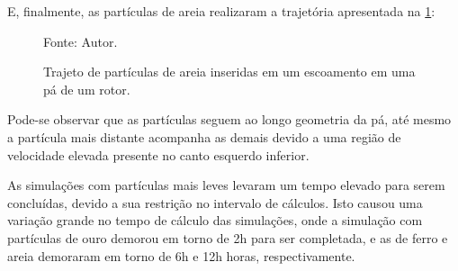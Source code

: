 E, finalmente, as partículas de areia realizaram a trajetória apresentada na \ref{rotor_trajectory_sand}:
\begin{figure}[H]
    \centering
     {\raggedleft \scriptsize Fonte: Autor.}
    \caption{Trajeto de partículas de areia inseridas em um escoamento em uma pá de um rotor.}
    \label{rotor_trajectory_sand}
\end{figure}

Pode-se observar que as partículas seguem ao longo geometria da pá, até mesmo a partícula mais distante acompanha as demais devido a uma região de velocidade elevada presente no canto esquerdo inferior.

As simulações com partículas mais leves levaram um tempo elevado para serem concluídas, devido a sua restrição no intervalo de cálculos.
Isto causou uma variação grande no tempo de cálculo das simulações, onde a simulação com partículas de ouro demorou em torno de 2h para ser completada, e as de ferro e areia demoraram em torno de 6h e 12h horas, respectivamente.